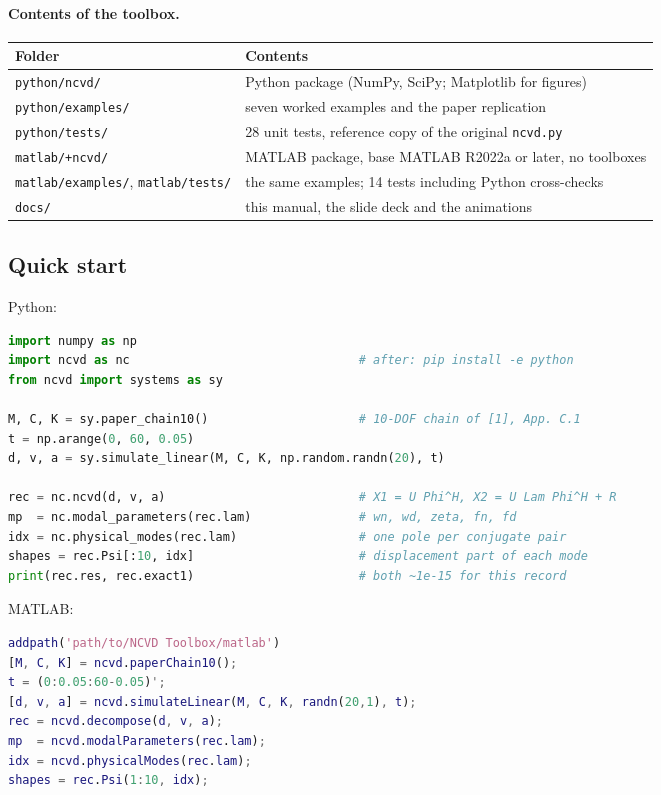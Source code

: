 \documentclass[report]{nld}
\theoremstyle{remark}\newtheorem*{remark}{Remark}
\newcommand{\code}[1]{\texttt{#1}}
\begin{document}
\paragraph{Contents of the toolbox.}
\begin{center}\small
\begin{tabularx}{\linewidth}{@{}>{\raggedright}p{4.3cm}X@{}}
\toprule
Folder & Contents\\
\midrule
\code{python/ncvd/} & Python package (NumPy, SciPy; Matplotlib for figures)\\
\code{python/examples/} & seven worked examples and the paper replication\\
\code{python/tests/} & 28 unit tests, reference copy of the original \code{ncvd.py}\\
\code{matlab/+ncvd/} & MATLAB package, base MATLAB R2022a or later, no toolboxes\\
\code{matlab/examples/}, \code{matlab/tests/} & the same examples; 14 tests including Python cross-checks\\
\code{docs/} & this manual, the slide deck and the animations\\
\bottomrule
\end{tabularx}
\end{center}

\subsection{Quick start}

Python:
\begin{lstlisting}[language=Python]
import numpy as np
import ncvd as nc                                # after: pip install -e python
from ncvd import systems as sy

M, C, K = sy.paper_chain10()                     # 10-DOF chain of [1], App. C.1
t = np.arange(0, 60, 0.05)
d, v, a = sy.simulate_linear(M, C, K, np.random.randn(20), t)

rec = nc.ncvd(d, v, a)                           # X1 = U Phi^H, X2 = U Lam Phi^H + R
mp  = nc.modal_parameters(rec.lam)               # wn, wd, zeta, fn, fd
idx = nc.physical_modes(rec.lam)                 # one pole per conjugate pair
shapes = rec.Psi[:10, idx]                       # displacement part of each mode
print(rec.res, rec.exact1)                       # both ~1e-15 for this record
\end{lstlisting}
MATLAB:
\begin{lstlisting}[language=Matlab]
addpath('path/to/NCVD Toolbox/matlab')
[M, C, K] = ncvd.paperChain10();
t = (0:0.05:60-0.05)';
[d, v, a] = ncvd.simulateLinear(M, C, K, randn(20,1), t);
rec = ncvd.decompose(d, v, a);
mp  = ncvd.modalParameters(rec.lam);
idx = ncvd.physicalModes(rec.lam);
shapes = rec.Psi(1:10, idx);
\end{lstlisting}
\end{document}
